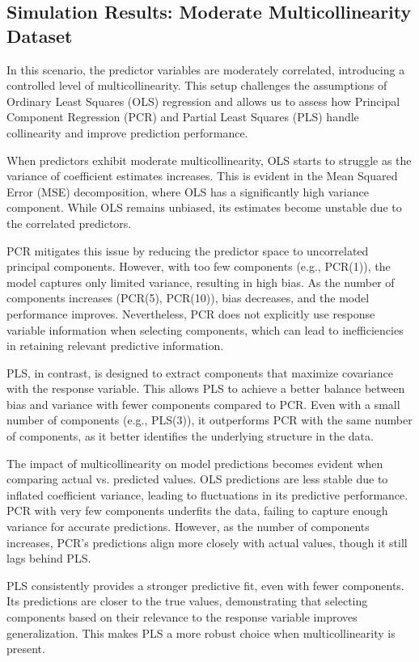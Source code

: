 \documentclass[11pt,twoside,a4paper]{article}
\begin{document}
\subsection{Simulation Results: Moderate Multicollinearity Dataset}  

In this scenario, the predictor variables are moderately correlated, introducing a controlled level of multicollinearity. This setup challenges the assumptions of Ordinary Least Squares (OLS) regression and allows us to assess how Principal Component Regression (PCR) and Partial Least Squares (PLS) handle collinearity and improve prediction performance.

When predictors exhibit moderate multicollinearity, OLS starts to struggle as the variance of coefficient estimates increases. This is evident in the Mean Squared Error (MSE) decomposition, where OLS has a significantly high variance component. While OLS remains unbiased, its estimates become unstable due to the correlated predictors.

PCR mitigates this issue by reducing the predictor space to uncorrelated principal components. However, with too few components (e.g., PCR(1)), the model captures only limited variance, resulting in high bias. As the number of components increases (PCR(5), PCR(10)), bias decreases, and the model performance improves. Nevertheless, PCR does not explicitly use response variable information when selecting components, which can lead to inefficiencies in retaining relevant predictive information.

PLS, in contrast, is designed to extract components that maximize covariance with the response variable. This allows PLS to achieve a better balance between bias and variance with fewer components compared to PCR. Even with a small number of components (e.g., PLS(3)), it outperforms PCR with the same number of components, as it better identifies the underlying structure in the data.

The impact of multicollinearity on model predictions becomes evident when comparing actual vs. predicted values. OLS predictions are less stable due to inflated coefficient variance, leading to fluctuations in its predictive performance. PCR with very few components underfits the data, failing to capture enough variance for accurate predictions. However, as the number of components increases, PCR’s predictions align more closely with actual values, though it still lags behind PLS.

PLS consistently provides a stronger predictive fit, even with fewer components. Its predictions are closer to the true values, demonstrating that selecting components based on their relevance to the response variable improves generalization. This makes PLS a more robust choice when multicollinearity is present.
\end{document}
